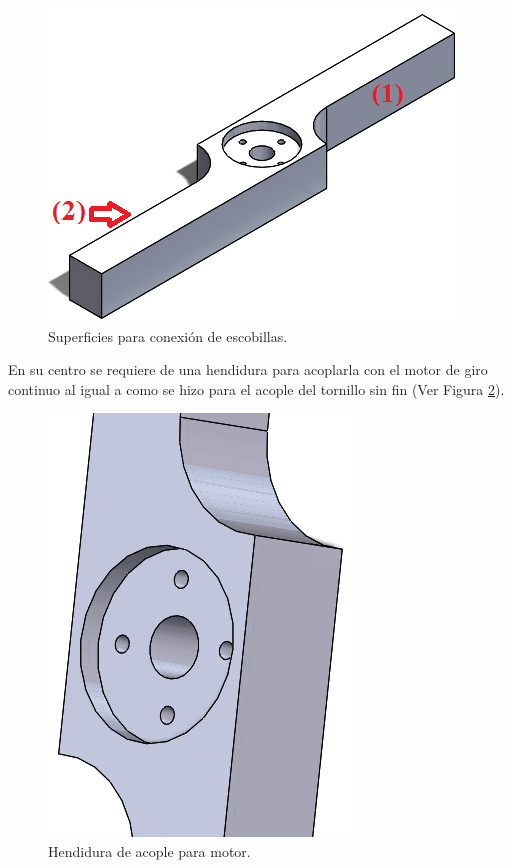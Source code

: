     \begin{figure}[H]
	    \begin{center}
	    	\includegraphics[scale=0.50]{img/barredores.png}
        \end{center}
	    \caption{Superficies para conexión de escobillas. \label{barredorespng}}
    \end{figure}
    
    En su centro se requiere de una hendidura para acoplarla con el motor de giro continuo al igual a como se hizo para el acople del tornillo sin fin (Ver Figura \ref{acopleservopng}).

    \begin{figure}[H]
	    \begin{center}
	    	\includegraphics[scale=0.45]{img/acople_servo.png}
        \end{center}
	    \caption{Hendidura de acople para motor. \label{acopleservopng}}
    \end{figure}

